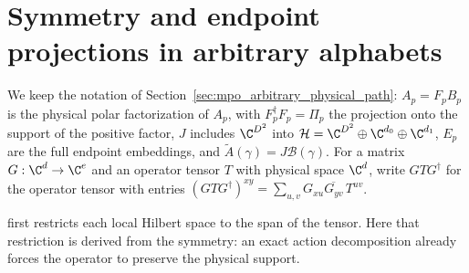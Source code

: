 
\section{Symmetry and endpoint projections in arbitrary alphabets}
\label{sec:mpo_arbitrary_physical_symmetry}

We keep the notation of Section~\ref{sec:mpo_arbitrary_physical_path}:
$A_p=F_pB_p$ is the physical polar factorization of $A_p$, with
$F_p^\dagger F_p=\Pi_p$ the projection onto the support of the positive
factor, $J$ includes $\C^{D^2}$ into
$\mathcal H=\C^{D^2}\oplus\C^{d_0}\oplus\C^{d_1}$, $E_p$ are the full
endpoint embeddings, and $\widetilde A(\gamma)=J\mathcal B(\gamma)$.
For a matrix $G:\C^{d}\to\C^{e}$ and an operator tensor $T$ with
physical space $\C^d$, write $GTG^\dagger$ for the operator tensor with
entries $(GTG^\dagger)^{xy}=\sum_{u,v}G_{xu}\overline{G_{yv}}\,T^{uv}$.

\cite[Section~5]{GarreRubio2023MPOSym} first restricts each local
Hilbert space to the span of the tensor. Here that restriction is
derived from the symmetry: an exact action decomposition already forces
the operator to preserve the physical support.

